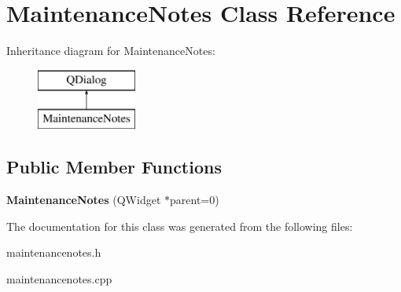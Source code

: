 \hypertarget{class_maintenance_notes}{}\section{Maintenance\+Notes Class Reference}
\label{class_maintenance_notes}
Inheritance diagram for Maintenance\+Notes\+:\begin{figure}[H]
\begin{center}
\leavevmode
\includegraphics[height=2.000000cm]{class_maintenance_notes}
\end{center}
\end{figure}
\subsection*{Public Member Functions}
\begin{DoxyCompactItemize}
\item 
\mbox{\label{class_maintenance_notes_a2292145a9e3a33029b26059b11201ea1}} 
{\bfseries Maintenance\+Notes} (Q\+Widget $\ast$parent=0)
\end{DoxyCompactItemize}


The documentation for this class was generated from the following files\+:\begin{DoxyCompactItemize}
\item 
maintenancenotes.\+h\item 
maintenancenotes.\+cpp\end{DoxyCompactItemize}
